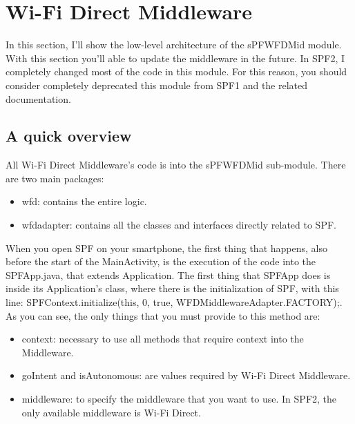 \chapter{Wi-Fi Direct Middleware}
\label{chap2}
\thispagestyle{empty}

\noindent In this section, I'll show the low-level architecture of the \textsf{sPFWFDMid} module. With this section you'll able to update the middleware in the future. In SPF2, I completely changed most of the code in this module. For this reason, you should consider completely deprecated this module from SPF1 and the related documentation.

\section{A quick overview}

All Wi-Fi Direct Middleware's code is into the \textsf{sPFWFDMid} sub-module. There are two main packages:

\begin{itemize}
	\item \textsf{wfd}: contains the entire logic.
	\item \textsf{wfdadapter}: contains all the classes and interfaces directly related to SPF.
\end{itemize}

When you open SPF on your smartphone, the first thing that happens, also before the start of the MainActivity, is the execution of the code into the \textsf{SPFApp.java}, that extends \textsf{Application}. 
The first thing that \textsf{SPFApp} does is inside its Application's class, where there is the initialization of SPF, with this line: \textsf{SPFContext.initialize(this, 0, true, WFDMiddlewareAdapter.FACTORY);}. As you can see, the only things that you must provide to this method are:
\begin{itemize}
	\item \textsf{context}: necessary to use all methods that require context into the Middleware.
	\item \textsf{goIntent} and \textsf{isAutonomous}: are values required by Wi-Fi Direct Middleware.
	\item \textsf{middleware}: to specify the middleware that you want to use. In SPF2, the only available middleware is Wi-Fi Direct.
\end{itemize}


